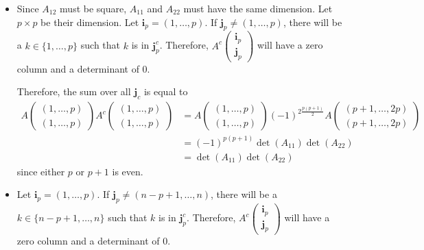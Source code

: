 \begin{solution}
  \begin{itemize}
    \item
      Since $A_{12}$ must be square,
      $A_{11}$ and $A_{22}$ must have the same dimension.
      Let $p \times p$ be their dimension.
      Let $\mathbf{i}_p = (1, \ldots, p)$.
      If $\mathbf{j}_p \neq (1, \ldots, p)$,
      there will be a $k \in \{1, \ldots, p\}$ such that
      $k$ is in $\mathbf{j}_p^c$.
      Therefore,
      \(
      A^c
      \begin{pmatrix}
        \mathbf{i}_p\\
        \mathbf{j}_p
      \end{pmatrix}
      \)
      will have a zero column and a determinant of 0.

      Therefore, the sum over all $\mathbf{j}_c$
      is equal to
      \begin{align*}
        A
        \begin{pmatrix}
          (1, \ldots, p)\\
          (1, \ldots, p)
        \end{pmatrix}
        A^c
        \begin{pmatrix}
          (1, \ldots, p)\\
          (1, \ldots, p)
        \end{pmatrix}
        & = A
        \begin{pmatrix}
          (1, \ldots, p)\\
          (1, \ldots, p)
        \end{pmatrix}
        (-1)^{2\frac{p(p+1)}{2}}
        A
        \begin{pmatrix}
          (p+1, \ldots, 2p)\\
          (p+1, \ldots, 2p)
        \end{pmatrix}\\
        & = (-1)^{p(p+1)}\det(A_{11}) \det(A_{22})\\
        & = \det(A_{11}) \det(A_{22})
      \end{align*}
      since either $p$ or $p+1$ is even.
    \item
      Let $\mathbf{i}_p = (1, \ldots, p)$.
      If $\mathbf{j}_p \neq (n-p+1, \ldots, n)$,
      there will be a $k \in \{n-p+1, \ldots, n\}$ such that
      $k$ is in $\mathbf{j}_p^c$.
      Therefore,
      \(
      A^c
      \begin{pmatrix}
        \mathbf{i}_p\\
        \mathbf{j}_p
      \end{pmatrix}
      \)
      will have a zero column and a determinant of 0.


\end{itemize}
\end{solution}

